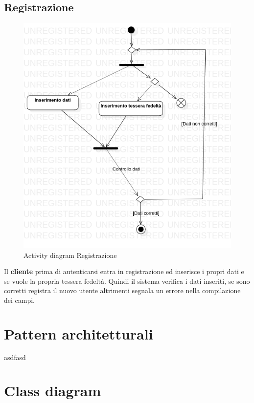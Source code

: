 \documentclass[12pt, a4paper]{article}
\begin{document}
\subsection{Registrazione}
\begin{figure}[h]
\centering
\includegraphics[width=\textwidth]{Use Case Model!Registrazione!ActivityRegistrazione!ActivityDiagramRegistrazione_2.png}
\caption{Activity diagram Registrazione}
\end{figure}

Il \textbf{cliente} prima di autenticarsi entra in registrazione ed inserisce i propri dati e se vuole la propria tessera fedeltà. 
Quindi il sistema verifica i dati inseriti, se sono corretti registra il nuovo utente altrimenti segnala un errore nella compilazione dei campi.

\section{Pattern architetturali}

asdfasd

\section{Class diagram}
\end{document}
